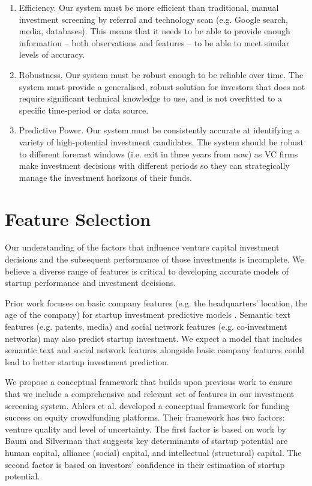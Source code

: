\documentclass[../thesis/thesis.tex]{subfiles}
\begin{document}
\begin{refsection}
\begin{enumerate}
\item Efficiency. Our system must be more efficient than traditional, manual investment screening by referral and technology scan (e.g. Google search, media, databases). This means that it needs to be able to provide enough information -- both observations and features -- to be able to meet similar levels of accuracy.

\item Robustness. Our system must be robust enough to be reliable over time. The system must provide a generalised, robust solution for investors that does not require significant technical knowledge to use, and is not overfitted to a specific time-period or data source.

\item Predictive Power. Our system must be consistently accurate at identifying a variety of high-potential investment candidates. The system should be robust to different forecast windows (i.e. exit in three years from now) as VC firms make investment decisions with different periods so they can strategically manage the investment horizons of their funds.

\end{enumerate}

\section{Feature Selection}

Our understanding of the factors that influence venture capital investment decisions and the subsequent performance of those investments is incomplete. We believe a diverse range of features is critical to developing accurate models of startup performance and investment decisions.

Prior work focuses on basic company features (e.g. the headquarters' location, the age of the company) for startup investment predictive models \cite{beckwith2016, gimmon2010}. Semantic text features (e.g. patents, media) \cite{hoenen2014, yuan2016} and social network features (e.g. co-investment networks) \cite{werth2013, cheng2016, yu2015} may also predict startup investment. We expect a model that includes semantic text and social network features alongside basic company features could lead to better startup investment prediction.

We propose a conceptual framework that builds upon previous work to ensure that we include a comprehensive and relevant set of features in our investment screening system.  Ahlers et al. \cite{ahlers2015} developed a conceptual framework for funding success on equity crowdfunding platforms. Their framework has two factors: venture quality and level of uncertainty. The first factor is based on work by Baum and Silverman \cite{baum2004} that suggests key determinants of startup potential are human capital, alliance (social) capital, and intellectual (structural) capital. The second factor is based on investors' confidence in their estimation of startup potential.


\end{refsection}
\end{document}
